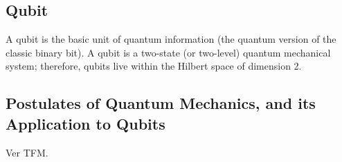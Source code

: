 \subsection{Qubit}

A qubit is the basic unit of quantum information (the quantum version of the classic binary bit).
A qubit is a two-state (or two-level) quantum mechanical system; therefore, qubits live within the Hilbert space of dimension 2.

\subsection{Postulates of Quantum Mechanics, and its Application to Qubits}
Ver TFM.